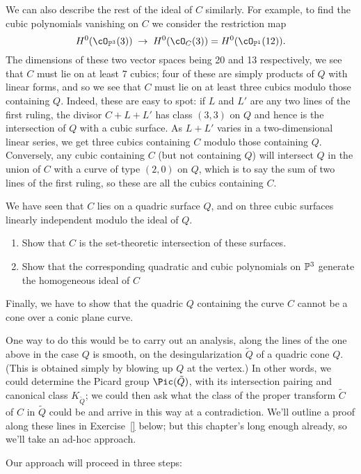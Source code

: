 We can also describe the rest of the ideal of $C$ similarly. For example, to find the cubic polynomials vanishing on $C$ we consider the restriction map
$$
H^0(\cO_{\PP^3}(3)) \; \to \; H^0(\cO_{C}(3)) = H^0(\cO_{\PP^1}(12)).
$$
The dimensions of these two vector spaces being 20 and 13 respectively, we see that $C$ must lie on at least 7 cubics; four of these are simply products of $Q$ with linear forms, and so we see that $C$ must lie on at least three cubics modulo those containing $Q$. Indeed, these are easy to spot: if $L$ and $L'$ are any two lines of the first ruling, the divisor $C + L + L'$ has class $(3,3)$ on $Q$ and hence is the intersection of $Q$ with a cubic surface. As $L+L'$ varies in a two-dimensional linear series, we get three cubics containing $C$ modulo those containing $Q$. Conversely, any cubic containing $C$ (but not containing $Q$) will intersect $Q$ in the union of $C$ with a curve of type $(2,0)$ on $Q$, which is to say the sum of two lines of the first ruling, so these are all the cubics containing $C$.

\begin{exercise}
We have seen that $C$ lies on a quadric surface $Q$, and on three cubic surfaces linearly independent modulo the ideal of $Q$.
\begin{enumerate}
\item Show that $C$ is the set-theoretic intersection of these surfaces.
\item Show that the corresponding quadratic and cubic polynomials on $\PP^3$ generate the homogeneous ideal of $C$
\end{enumerate}
\end{exercise}

Finally, we have to show that the quadric $Q$ containing the curve $C$ cannot be a cone over a conic plane curve. 

One way to do this would be to carry out an analysis, along the lines of the one above in the case $Q$ is smooth, on the desingularization $\tilde Q$ of a quadric cone $Q$. (This is obtained simply by  blowing up $Q$ at the vertex.) In other words, we could determine the Picard group $\Pic(\tilde Q)$, with its intersection pairing and canonical class $K_{\tilde Q}$; we could then ask what the class of the proper transform $\tilde C$ of $C$ in $\tilde Q$ could be and arrive in this way at a contradiction. We'll outline a proof along these lines in Exercise~\ref{} below; but this chapter's long enough already, so we'll take an ad-hoc approach.

Our approach will proceed in three steps:

